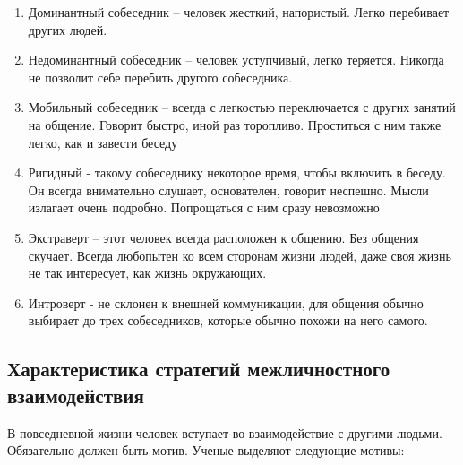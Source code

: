 \documentclass{article}
\begin{document}
\begin{enumerate}
    \item Доминантный собеседник – человек жесткий, напористый. Легко перебивает других людей.
    \item Недоминантный собеседник – человек уступчивый, легко теряется. Никогда не позволит себе перебить другого собеседника.
    \item Мобильный собеседник – всегда с легкостью переключается с других занятий на общение. Говорит быстро, иной раз торопливо. Проститься с ним также легко, как и завести беседу
    \item Ригидный - такому собеседнику некоторое время, чтобы включить в беседу. Он всегда внимательно слушает, основателен, говорит неспешно. Мысли излагает очень подробно. Попрощаться с ним сразу невозможно
    \item Экстраверт – этот человек всегда расположен к общению. Без общения скучает. Всегда любопытен ко всем сторонам жизни людей, даже своя жизнь не так интересует, как жизнь окружающих.
    \item Интроверт - не склонен к внешней коммуникации, для общения обычно выбирает до трех собеседников, которые обычно похожи на него самого.
\end{enumerate}

\subsection{Характеристика стратегий межличностного взаимодействия}

В повседневной жизни человек вступает во взаимодействие с другими людьми. Обязательно должен быть мотив. Ученые выделяют следующие мотивы:

\begin{multienumerate}
\end{multienumerate}
\end{document}
